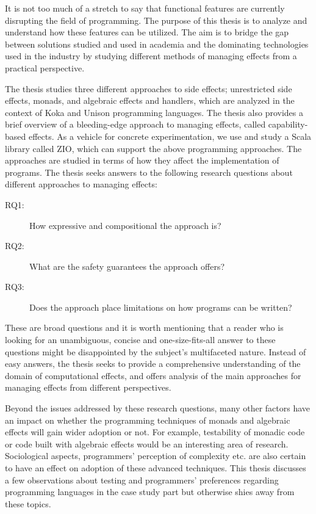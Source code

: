 It is not too much of a stretch to say that functional features are currently disrupting the field of programming. The purpose of this thesis is to analyze and understand how these features can be utilized. The aim is to bridge the gap between solutions studied and used in academia and the dominating technologies used in the industry by studying different methods of managing effects from a practical perspective.

The thesis studies three different approaches to side effects; unrestricted side effects, monads, and algebraic effects and handlers, which are analyzed in the context of Koka and Unison programming languages. The thesis also provides a brief overview of a bleeding-edge approach to managing effects, called capability-based effects. As a vehicle for concrete experimentation, we use and study a Scala library called ZIO, which can support the above programming approaches. The approaches are studied in terms of how they affect the implementation of programs. The thesis seeks answers to the following research questions about different approaches to managing effects:
\begin{description}
    \item[RQ1:] How expressive and compositional the approach is?
    \item[RQ2:] What are the safety guarantees the approach offers?
    \item[RQ3:] Does the approach place limitations on how programs can be written?
\end{description}

These are broad questions and it is worth mentioning that a reader who is looking for an unambiguous, concise and one-size-fits-all answer to these questions might be disappointed by the subject's multifaceted nature. Instead of easy answers, the thesis seeks to provide a comprehensive understanding of the domain of computational effects, and offers analysis of the main approaches for managing effects from different perspectives.

Beyond the issues addressed by these research questions, many other factors have an impact on whether the programming techniques of monads and algebraic effects will gain wider adoption or not. For example, testability of monadic code or code built with algebraic effects would be an interesting area of research. Sociological aspects, programmers' perception of complexity etc. are also certain to have an effect on adoption of these advanced techniques. This thesis discusses a few observations about testing and programmers' preferences regarding programming languages in the case study part but otherwise shies away from these topics.

